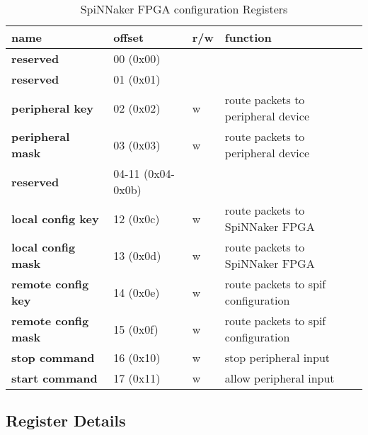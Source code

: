 \documentclass[11pt,a4paper,twoside]{article}
\begin{document}
\begin{table}[!ht]
	\begin{center}
		\renewcommand{\arraystretch}{1.2}
		\begin{tabular}{| l l l l |}
			\hline
			\textbf{name}        & \textbf{offset} & \textbf{r/w} & \textbf{function} \\%
			\hline
			\hline
			\cellcolor{gray!25}\textbf{reserved}           & \cellcolor{gray!25}00 (0x00)         & \cellcolor{gray!25}   & \cellcolor{gray!25}\\%
			\cellcolor{gray!25}\textbf{reserved}           & \cellcolor{gray!25}01 (0x01)         & \cellcolor{gray!25}   & \cellcolor{gray!25}\\%
			\textbf{peripheral key}     & 02 (0x02)         & w  & route packets to peripheral device             \\%
			\textbf{peripheral mask}    & 03 (0x03)         & w  & route packets to peripheral device             \\%
			\cellcolor{gray!25}\textbf{reserved}           & \cellcolor{gray!25}04-11 (0x04-0x0b) & \cellcolor{gray!25}   & \cellcolor{gray!25}\\%
			\textbf{local config key}   & 12 (0x0c)         & w  & route packets to SpiNNaker FPGA  \\%
			\textbf{local config mask}  & 13 (0x0d)         & w  & route packets to SpiNNaker FPGA  \\%
			\textbf{remote config key}  & 14 (0x0e)         & w  & route packets to spif configuration   \\%
			\textbf{remote config mask} & 15 (0x0f)         & w  & route packets to spif configuration   \\%
			\textbf{stop command}       & 16 (0x10)         & w  & stop peripheral input           \\%
			\textbf{start command}      & 17 (0x11)         & w  & allow peripheral input           \\%
			\hline
		\end{tabular}
		\caption{SpiNNaker FPGA configuration Registers}
	\end{center}
	\label{tab:spinn_regs}
\end{table}


\subsection{Register Details}


\clearpage
\end{document}
